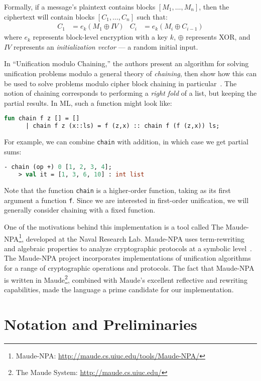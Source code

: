 \documentclass[11pt]{article}
\begin{document}
Formally, if a message's plaintext contains blocks $[M_1, \dotsc, M_n]$, then
the ciphertext will contain blocks $[C_1, \dotsc, C_n]$ such that:
\begin{align*}
    C_1 &= e_k(M_1 \oplus IV) &
    C_i &= e_k(M_i \oplus C_{i-1})
\end{align*}
where $e_k$ represents block-level encryption with a key $k$, $\oplus$
represents XOR, and $IV$ represents an \emph{initialization vector} --- a
random initial input.

In ``Unification modulo Chaining,'' the authors present an algorithm for
solving unification problems modulo a general theory of \emph{chaining}, then
show how this can be used to solve problems modulo cipher block chaining in
particular~\cite{anantharaman2012unification}. The notion of chaining
corresponds to performing a \emph{right fold} of a list, but keeping the
partial results.  In ML, such a function might look like:
\begin{lstlisting}[language=ML, style=smalllisting]
    fun chain f z [] = []
      | chain f z (x::ls) = f (z,x) :: chain f (f (z,x)) ls;
\end{lstlisting}
For example, we can combine \lstinline|chain| with addition, in which case we
get partial sums:
\begin{lstlisting}[language=ML, style=smalllisting]
    - chain (op +) 0 [1, 2, 3, 4];
    > val it = [1, 3, 6, 10] : int list
\end{lstlisting}
Note that the function \lstinline|chain| is a higher-order function, taking as
its first argument a function \lstinline|f|. Since we are interested in
first-order unification, we will generally consider chaining with a fixed
function.

One of the motivations behind this implementation is a tool called The
Maude-NPA\footnote{Maude-NPA: \url{http://maude.cs.uiuc.edu/tools/Maude-NPA/}},
developed at the Naval Research Lab. Maude-NPA uses term-rewriting and
algebraic properties to analyze cryptographic protocols at a symbolic
level~\cite{escobar2009maude}.  The Maude-NPA project incorporates
implementations of unification algorithms for a range of cryptographic
operations and protocols. The fact that Maude-NPA is written in
Maude\footnote{The Maude System: \url{http://maude.cs.uiuc.edu/}}, combined
with Maude's excellent reflective and rewriting capabilities, made the language
a prime candidate for our implementation.

\section{Notation and Preliminaries}\label{section:notation}
\end{document}
